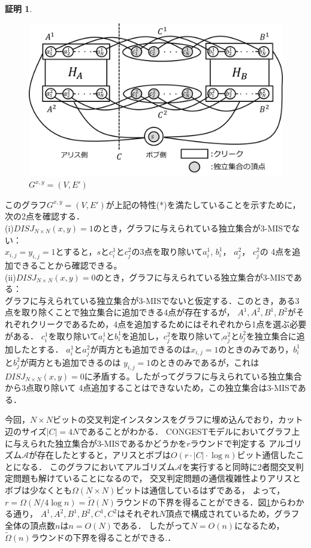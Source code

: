 \documentclass[12pt]{thesis}
\newcommand{\CONGEST}{\textsf{CONGEST}}
\theoremstyle{definition}
\newtheorem*{prf*}{証明}
\begin{document}
\begin{prf*}
\begin{figure}[ht]
\begin{center}
\includegraphics[width=120mm]{3_Gxy.png}
\end{center}
\caption{$G^{x, y} = (V, E')$}
\label{3_G(x,y)}
\end{figure}

このグラフ$G^{x, y} = (V, E')$が上記の特性(*)を満たしていることを示すために，次の2点を確認する． \\
(i)$DISJ_{N \times N} (x, y) = 1$のとき，グラフに与えられている独立集合が3-MISでない： \\
$x_{i, j} = y_{i, j} =1$とすると，$s$と$c_{i}^{1}$と$c_{j}^{2}$の3点を取り除いて$a_{i}^{1}$, $b_{i}^{1}$， $a_{j}^{2}$， $c_{j}^{2}$の
4点を追加できることから確認できる。 \\
(ii)$DISJ_{N \times N} (x, y) = 0$のとき，グラフに与えられている独立集合が3-MISである： \\ 
グラフに与えられている独立集合が3-MISでないと仮定する．このとき，ある3点を取り除くことで独立集合に追加できる4点が存在するが，
$A^{1}, A^{2}, B^{1}, B^{2}$がそれぞれクリークであるため，4点を追加するためにはそれぞれから1点を選ぶ必要がある．
$c_{i}^{1}$を取り除いて$a_{i}^{1}$と$b_{i}^{1}$を追加し，$c_{j}^{2}$を取り除いて,$a_{j}^{2}$と$b_{j}^{2}$を独立集合に追加したとする．
$a_{i}^{1}$と$a_{j}^{2}$が両方とも追加できるのは$x_{i, j} = 1$のときのみであり，$b_{i}^{1}$と$b_{j}^{2}$が両方とも追加できるのは
$y_{i, j} = 1$のときのみであるが，これは$DISJ_{N \times N} (x, y) = 0$に矛盾する。したがってグラフに与えられている独立集合から3点取り除いて
4点追加することはできないため，この独立集合は3-MISである．

今回，$N \times N$ビットの交叉判定インスタンスをグラフに埋め込んでおり，カット辺のサイズ$|C| = 4N$であることがわかる．
{\CONGEST}モデルにおいてグラフ上に与えられた独立集合が3-MISであるかどうかを$r$ラウンドで判定する
アルゴリズム$\mathcal{A}$が存在したとすると，アリスとボブは$O(r \cdot |C| \cdot \log n)$ビット通信したことになる．
このグラフにおいてアルゴリズム$\mathcal{A}$を実行すると同時に2者間交叉判定問題も解けていることになるので，
交叉判定問題の通信複雑性よりアリスとボブは少なくとも$\Omega (N \times N)$ビットは通信しているはずである，
よって，$r = \Omega (N / 4\log n) = \tilde{\Omega}(N)$ラウンドの下界を得ることができる．図\ref{3_G(x,y)}からわかる通り，
$A^{1}, A^{2}, B^{1}, B^{2}, C^{1}, C^{2}$はそれぞれ$N$頂点で構成されているため，グラフ全体の頂点数$n$は$n = O(N)$である．
したがって$N = O(n)$になるため，$\tilde{\Omega}(n)$ラウンドの下界を得ることができる.．
\end{prf*}
\newpage
\end{document}
